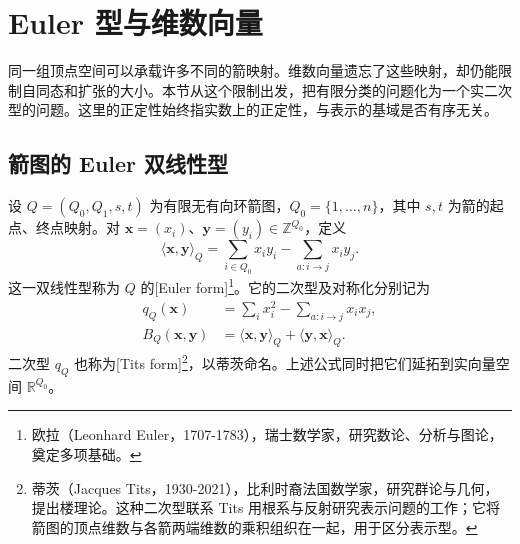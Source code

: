 \section{Euler 型与维数向量}
\label{b5:sec:1001}

同一组顶点空间可以承载许多不同的箭映射。维数向量遗忘了这些映射，却仍能限制自同态和扩张的大小。本节从这个限制出发，把有限分类的问题化为一个实二次型的问题。这里的正定性始终指实数上的正定性，与表示的基域是否有序无关。

\subsection{箭图的 Euler 双线性型}
\label{b5:subsec:1001:01}

\begin{definition}\label{b5:def:quiver-euler-form}
	设 \(Q=(Q_0,Q_1,s,t)\) 为有限无有向环箭图，\(Q_0=\{1,\ldots,n\}\)，其中 \(s,t\) 为箭的起点、终点映射。对 \(\mathbf x=(x_i)\)、\(\mathbf y=(y_i)\in\mathbb Z^{Q_0}\)，定义
	\[
		\langle\mathbf x,\mathbf y\rangle_Q =\sum_{i\in Q_0}x_i y_i-\sum_{a:i\to j}x_i y_j.
	\]
	这一双线性型称为 \(Q\) 的[Euler form]\footnote{欧拉（Leonhard Euler，1707-1783），瑞士数学家，研究数论、分析与图论，奠定多项基础。}。它的二次型及对称化分别记为
	\begin{equation}\label{b5:eq:quiver-tits-form}
		\begin{aligned}
			q_Q(\mathbf x)&=\sum_i x_i^2-\sum_{a:i\to j}x_i x_j,\\
			B_Q(\mathbf x,\mathbf y)&=\langle\mathbf x,\mathbf y\rangle_Q+ \langle\mathbf y,\mathbf x\rangle_Q.
		\end{aligned}
	\end{equation}
	二次型 \(q_Q\) 也称为[Tits form]\footnote{蒂茨（Jacques Tits，1930-2021），比利时裔法国数学家，研究群论与几何，提出楼理论。这种二次型联系 Tits 用根系与反射研究表示问题的工作；它将箭图的顶点维数与各箭两端维数的乘积组织在一起，用于区分表示型。}，以蒂茨命名。上述公式同时把它们延拓到实向量空间 \(\mathbb R^{Q_0}\)。
\end{definition}

